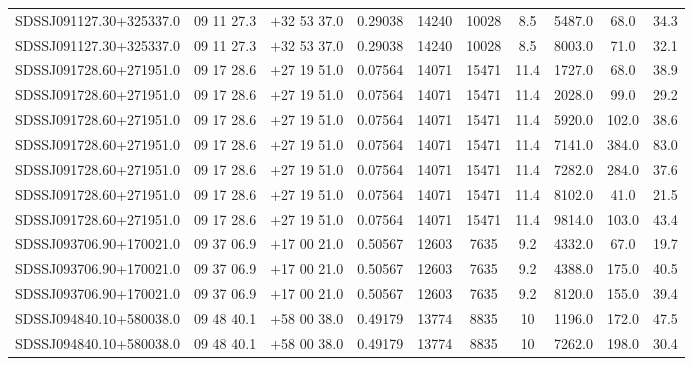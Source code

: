 \begin{landscape}
\begin{center}
\begin{longtable}{l c c c c c c c c c}
SDSSJ091127.30+325337.0  & 09 11 27.3  &         $+$32 53 37.0  &       0.29038  & 14240  &   10028  &      8.5  &       5487.0  &  68.0  &   34.3  \\
SDSSJ091127.30+325337.0  & 09 11 27.3  &         $+$32 53 37.0  &       0.29038  & 14240  &   10028  &      8.5  &       8003.0  &  71.0  &   32.1  \\
SDSSJ091728.60+271951.0  & 09 17 28.6  &         $+$27 19 51.0  &       0.07564  & 14071  &   15471  &      11.4  &      1727.0  &  68.0  &   38.9  \\
SDSSJ091728.60+271951.0  & 09 17 28.6  &         $+$27 19 51.0  &       0.07564  & 14071  &   15471  &      11.4  &      2028.0  &  99.0  &   29.2  \\
SDSSJ091728.60+271951.0  & 09 17 28.6  &         $+$27 19 51.0  &       0.07564  & 14071  &   15471  &      11.4  &      5920.0  &  102.0  &  38.6  \\
SDSSJ091728.60+271951.0  & 09 17 28.6  &         $+$27 19 51.0  &       0.07564  & 14071  &   15471  &      11.4  &      7141.0  &  384.0  &  83.0  \\
SDSSJ091728.60+271951.0  & 09 17 28.6  &         $+$27 19 51.0  &       0.07564  & 14071  &   15471  &      11.4  &      7282.0  &  284.0  &  37.6  \\
SDSSJ091728.60+271951.0  & 09 17 28.6  &         $+$27 19 51.0  &       0.07564  & 14071  &   15471  &      11.4  &      8102.0  &  41.0  &   21.5  \\
SDSSJ091728.60+271951.0  & 09 17 28.6  &         $+$27 19 51.0  &       0.07564  & 14071  &   15471  &      11.4  &      9814.0  &  103.0  &  43.4  \\
SDSSJ093706.90+170021.0  & 09 37 06.9  &         $+$17 00 21.0  &       0.50567  & 12603  &   7635  &       9.2  &       4332.0  &  67.0  &   19.7  \\
SDSSJ093706.90+170021.0  & 09 37 06.9  &         $+$17 00 21.0  &       0.50567  & 12603  &   7635  &       9.2  &       4388.0  &  175.0  &  40.5  \\
SDSSJ093706.90+170021.0  & 09 37 06.9  &         $+$17 00 21.0  &       0.50567  & 12603  &   7635  &       9.2  &       8120.0  &  155.0  &  39.4  \\
SDSSJ094840.10+580038.0  & 09 48 40.1  &         $+$58 00 38.0  &       0.49179  & 13774  &   8835  &       10  &        1196.0  &  172.0  &  47.5  \\
SDSSJ094840.10+580038.0  & 09 48 40.1  &         $+$58 00 38.0  &       0.49179  & 13774  &   8835  &       10  &        7262.0  &  198.0  &  30.4  \\

\end{longtable}
\end{center}
\end{landscape}
